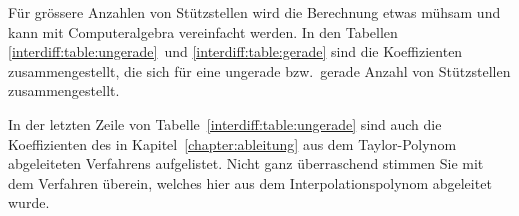 Für grössere Anzahlen von Stützstellen wird die Berechnung etwas mühsam
und kann mit Computeralgebra vereinfacht werden.
In den Tabellen \ref{interdiff:table:ungerade} und \ref{interdiff:table:gerade}
sind die Koeffizienten zusammengestellt, die sich für eine ungerade
bzw.~gerade Anzahl von Stützstellen zusammengestellt.

In der letzten Zeile von Tabelle~\ref{interdiff:table:ungerade} sind
auch die Koeffizienten des in Kapitel~\ref{chapter:ableitung} aus
dem Taylor-Polynom abgeleiteten Verfahrens aufgelistet.
Nicht ganz überraschend stimmen Sie mit dem Verfahren überein, welches
hier aus dem Interpolationspolynom abgeleitet wurde.



